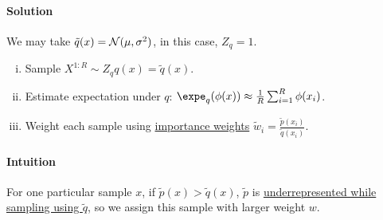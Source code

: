\documentclass{article}
\begin{document}
	\paragraph{Solution} We may take $\tilde{q}(x) = \mathcal{{N}}(\mu, \sigma^2)$, in this case, $Z_q = 1$.
	
	\begin{algorithm} \quad
		\begin{enumerate}[(i)]
			\item Sample $X^{1:R} \sim Z_q q(x)= \tilde{q}(x)$.
			\item Estimate expectation under $q$: $\expe_{q}(\phi(x)) \approx \frac{1}{R} \sum_{i=1}^R \phi(x_i)$.
			\item Weight each sample using \ul{importance weights} $\tilde{w}_i = \frac{\tilde{p}(x_i)}{\tilde{q}(x_i)}$.
		\end{enumerate}
	\end{algorithm}
	
	\paragraph{Intuition} For one particular sample $x$, if $\tilde{p}(x) > \tilde{q}(x)$, $\tilde{p}$ is \ul{underrepresented while sampling using $\tilde{q}$}, so we assign this sample with larger weight $w$.
	
\end{document}
